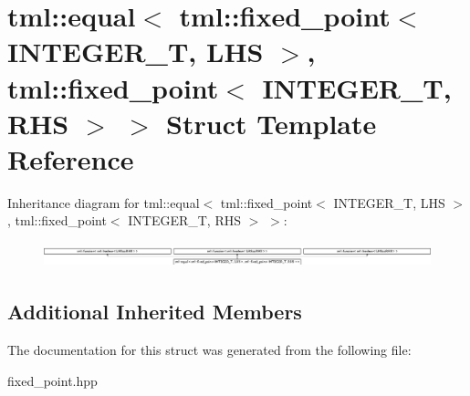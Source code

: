 \hypertarget{structtml_1_1equal_3_01tml_1_1fixed__point_3_01INTEGER__T_00_01LHS_01_4_00_01tml_1_1fixed__point836c1d88b34ba3901a45cda76427785e}{\section{tml\+:\+:equal$<$ tml\+:\+:fixed\+\_\+point$<$ I\+N\+T\+E\+G\+E\+R\+\_\+\+T, L\+H\+S $>$, tml\+:\+:fixed\+\_\+point$<$ I\+N\+T\+E\+G\+E\+R\+\_\+\+T, R\+H\+S $>$ $>$ Struct Template Reference}
\label{structtml_1_1equal_3_01tml_1_1fixed__point_3_01INTEGER__T_00_01LHS_01_4_00_01tml_1_1fixed__point836c1d88b34ba3901a45cda76427785e}
}
Inheritance diagram for tml\+:\+:equal$<$ tml\+:\+:fixed\+\_\+point$<$ I\+N\+T\+E\+G\+E\+R\+\_\+\+T, L\+H\+S $>$, tml\+:\+:fixed\+\_\+point$<$ I\+N\+T\+E\+G\+E\+R\+\_\+\+T, R\+H\+S $>$ $>$\+:\begin{figure}[H]
\begin{center}
\leavevmode
\includegraphics[height=0.724919cm]{structtml_1_1equal_3_01tml_1_1fixed__point_3_01INTEGER__T_00_01LHS_01_4_00_01tml_1_1fixed__point836c1d88b34ba3901a45cda76427785e}
\end{center}
\end{figure}
\subsection*{Additional Inherited Members}


The documentation for this struct was generated from the following file\+:\begin{DoxyCompactItemize}
\item 
fixed\+\_\+point.\+hpp\end{DoxyCompactItemize}

